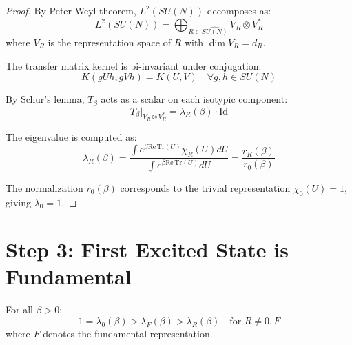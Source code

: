 \begin{proof}
By Peter-Weyl theorem, $L^2(SU(N))$ decomposes as:
\begin{equation}
L^2(SU(N)) = \bigoplus_{R \in \widehat{SU(N)}} V_R \otimes V_R^*
\end{equation}
where $V_R$ is the representation space of $R$ with $\dim V_R = d_R$.

The transfer matrix kernel is bi-invariant under conjugation:
\begin{equation}
K(gUh, gVh) = K(U, V) \quad \forall g, h \in SU(N)
\end{equation}

By Schur's lemma, $T_\beta$ acts as a scalar on each isotypic component:
\begin{equation}
T_\beta|_{V_R \otimes V_R^*} = \lambda_R(\beta) \cdot \mathrm{Id}
\end{equation}

The eigenvalue is computed as:
\begin{equation}
\lambda_R(\beta) = \frac{\int e^{\beta \mathrm{Re}\,\mathrm{Tr}(U)} \chi_R(U) dU}{\int e^{\beta \mathrm{Re}\,\mathrm{Tr}(U)} dU} = \frac{r_R(\beta)}{r_0(\beta)}
\end{equation}

The normalization $r_0(\beta)$ corresponds to the trivial representation 
$\chi_0(U) = 1$, giving $\lambda_0 = 1$.
\end{proof}

\section{Step 3: First Excited State is Fundamental}

\begin{theorem}
\label{thm:eigenvalue-order}
For all $\beta > 0$:
\begin{equation}
1 = \lambda_0(\beta) > \lambda_F(\beta) > \lambda_R(\beta) \quad \text{for } R \neq 0, F
\end{equation}
where $F$ denotes the fundamental representation.
\end{theorem}

